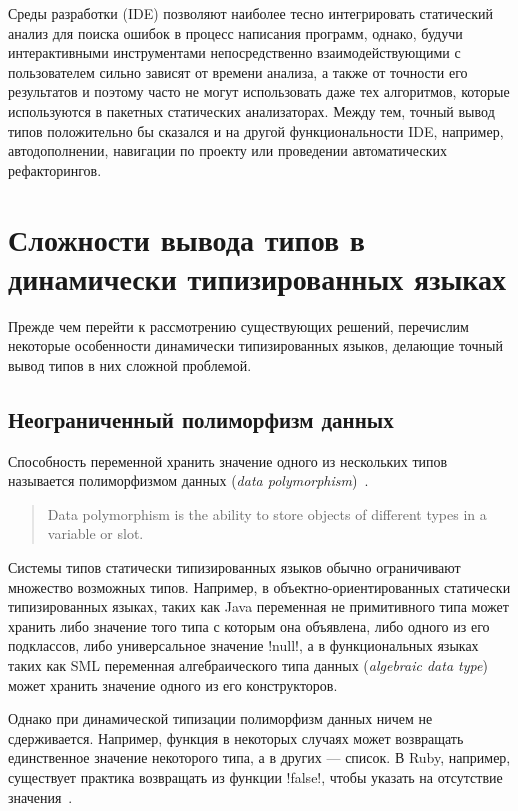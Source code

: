 Среды разработки (IDE) позволяют наиболее тесно интегрировать статический анализ
для поиска ошибок в процесс написания программ, однако, будучи
интерактивными инструментами непосредственно взаимодействующими с пользователем
сильно зависят от времени анализа, а также от точности его результатов и поэтому
часто не могут использовать даже тех алгоритмов, которые используются в пакетных
статических анализаторах. Между тем, точный вывод типов положительно бы сказался
и на другой функциональности IDE, например, автодополнении, навигации по проекту
или проведении автоматических рефакторингов.


\section{Сложности вывода типов в динамически типизированных языках}
\label{sec:difficulties}

Прежде чем перейти к рассмотрению существующих решений, перечислим некоторые
особенности динамически типизированных языков, делающие точный вывод типов в них
сложной проблемой.

\subsection{Неограниченный полиморфизм данных}

Способность переменной хранить значение одного из нескольких типов называется
полиморфизмом данных (\emph{data polymorphism})~\cite{Agesen1995}. 

\begin{quote}
  Data polymorphism is the ability to store objects of different types in a
  variable or slot. 
\end{quote}

Системы типов статически типизированных языков обычно ограничивают множество
возможных типов.  Например, в объектно-ориентированных статически типизированных
языках, таких как Java переменная не примитивного типа может хранить либо
значение того типа с которым она объявлена, либо одного из его подклассов, либо
универсальное значение !null!, а в функциональных языках таких как SML
переменная алгебраического типа данных (\emph{algebraic data type}) может
хранить значение одного из его конструкторов.

Однако при динамической типизации полиморфизм данных ничем не
сдерживается. Например, функция в некоторых случаях может возвращать
единственное значение некоторого типа, а в других --- список. В Ruby,
например, существует практика возвращать из функции !false!, чтобы указать на
отсутствие значения~\cite{Ren2013}. 


